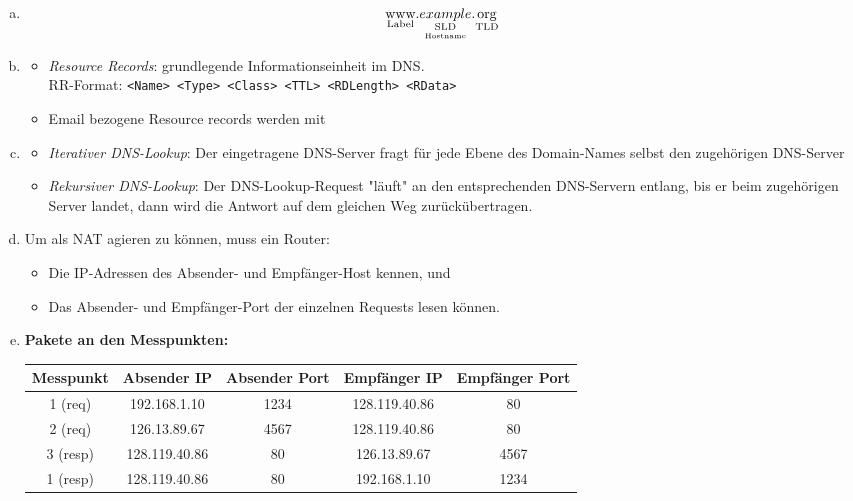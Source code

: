 \pagebreak

\begin{enumerate}[a)]
	
	\item $$\underset{\text{Label}}{\text{www}}.\underset{\underset{\text{Hostname}}{\text{SLD}}}{example}.\underset{\text{TLD}}{\text{org}}$$
	
	\item \begin{itemize}
		\item \emph{Resource Records}: grundlegende Informationseinheit im DNS. \\
		   RR-Format: \texttt{<Name> <Type> <Class> <TTL> <RDLength> <RData>}
		\item Email bezogene Resource records werden mit 
	\end{itemize}
	
	\item \begin{itemize}
		\item \emph{Iterativer DNS-Lookup}: Der eingetragene DNS-Server fragt für jede Ebene des Domain-Names selbst den 
		zugehörigen DNS-Server
		\item \emph{Rekursiver DNS-Lookup}: Der DNS-Lookup-Request "läuft" an den entsprechenden DNS-Servern entlang,
		bis er beim zugehörigen Server landet, dann wird die Antwort auf dem gleichen Weg zurückübertragen.
	\end{itemize}
	
	\item Um als NAT agieren zu können, muss ein Router: 
	\begin{itemize}
		\item Die IP-Adressen des Absender- und Empfänger-Host kennen, und
		\item Das Absender- und Empfänger-Port der einzelnen Requests lesen können.
	\end{itemize}
	
	\item \textbf{Pakete an den Messpunkten:} \\
		\begin{tabular}{c||c|c||c|c}
			Messpunkt & Absender IP   & Absender Port & Empfänger IP  & Empfänger Port \\ \hline
			1 (req)   & 192.168.1.10  & 1234          & 128.119.40.86 & 80             \\ 
			2 (req)   & 126.13.89.67  & 4567          & 128.119.40.86 & 80             \\ 
			3 (resp)  & 128.119.40.86 & 80            & 126.13.89.67  & 4567           \\ 
			1 (resp)  & 128.119.40.86 & 80            & 192.168.1.10  & 1234
		\end{tabular}


\end{enumerate}
